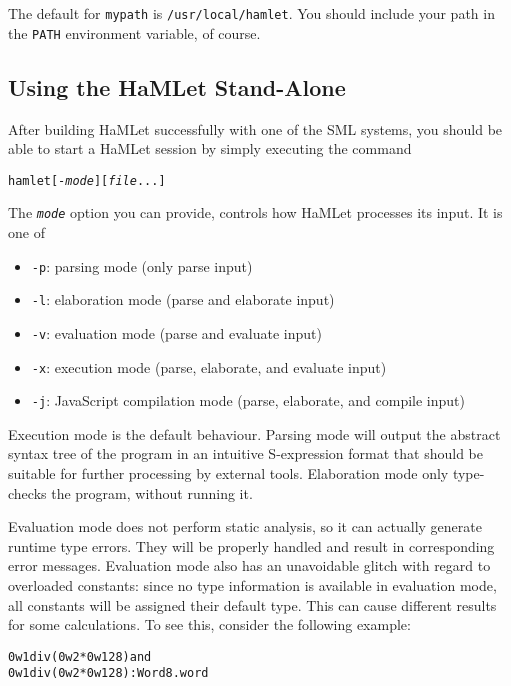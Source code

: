 \documentclass[twoside,titlepage]{article}
\begin{document}
The default for {\tt mypath} is {\tt /usr/local/hamlet}. You should include your path in the {\tt PATH} environment variable, of course.


\subsection{Using the HaMLet Stand-Alone}
\label{usingstandalone}

After building HaMLet successfully with one of the SML systems, you should be able to start a HaMLet session by simply executing the command

\begin{quoting}
\begin{alltt}
hamlet [-{\it{mode}}] [{\it file} ...]
\end{alltt}
\end{quoting}

The {\tt\it mode} option you can provide, controls how HaMLet processes its input. It is one of

\begin{itemize}[nolistsep]
\item {\tt -p}: parsing mode (only parse input)
\item {\tt -l}: elaboration mode (parse and elaborate input)
\item {\tt -v}: evaluation mode (parse and evaluate input)
\item {\tt -x}: execution mode (parse, elaborate, and evaluate input)
\item {\tt -j}: JavaScript compilation mode (parse, elaborate, and compile input)
\end{itemize}

Execution mode is the default behaviour. Parsing mode will output the abstract syntax tree of the program in an intuitive S-expression format that should be suitable for further processing by external tools. Elaboration mode only type-checks the program, without running it.

Evaluation mode does not perform static analysis, so it can actually generate runtime type errors. They will be properly handled and result in corresponding error messages. Evaluation mode also has an unavoidable glitch with regard to overloaded constants: since no type information is available in evaluation mode, all constants will be assigned their default type. This can cause different results for some calculations. To see this, consider the following example:

\begin{quoting}
\begin{alltt}
0w1 div (0w2 * 0w128)                {\rm and}
0w1 div (0w2 * 0w128) : Word8.word
\end{alltt}
\end{quoting}
\end{document}
